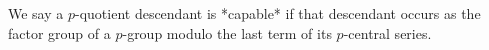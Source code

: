 

We say a $p$-quotient descendant is *capable* if that  descendant  occurs
as the  factor  group  of  a  $p$-group  modulo  the  last  term  of  its
$p$-central series.

